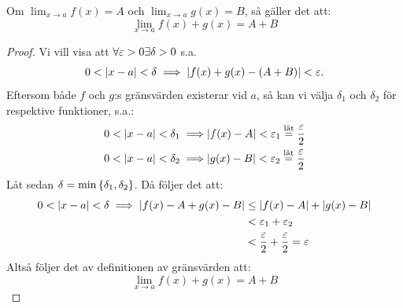 \begin{theorem}\label{sats:add-g-v.}
	Om $\lim_{x\to a}f(x)=A$ och $\lim_{x\to a}g(x)=B$, så gäller det att:
	$$
		\lim_{x\to a}f(x)+g(x)=A+B
	$$
	
	\begin{proof}
		Vi vill visa att $\forall\eps>0\exists\delta>0$ s.a.
		$$
			0<\qty|x-a|<\delta\implies\qty|f(x)+g(x)-(A+B)|<\eps.
		$$
		Eftersom både $f$ och $g$:s gränsvärden existerar vid $a$, så kan vi välja
		$\delta_1$ och $\delta_2$ för respektive funktioner, s.a.:
		\begin{align*}
			0<\qty|x-a|<\delta_1\implies&\qty|f(x)-A|<\eps_1\leteq\frac{\eps}{2}\\
			0<\qty|x-a|<\delta_2\implies&\qty|g(x)-B|<\eps_2\leteq\frac{\eps}{2}
		\end{align*}
		Låt sedan $\delta=\min\qty{\delta_1,\delta_2}$\footnotemark. Då följer det
		att:
		\begin{align*}
			0<\qty|x-a|<\delta\implies\qty|f(x)-A+g(x)-B|
			&\leq\qty|f(x)-A|+\qty|g(x)-B|\\
			&<\eps_1+\eps_2\\
			&<\frac{\eps}{2}+\frac{\eps}{2}=\eps
		\end{align*}
		Altså följer det av definitionen av gränsvärden att:
		$$
			\lim_{x\to a}f(x)+g(x)=A+B
		$$
	\end{proof}

\end{theorem}

